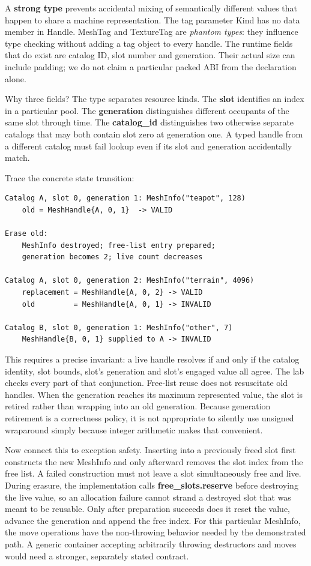 A \textbf{strong type} prevents accidental mixing of semantically different values that happen to share a machine representation. The tag parameter Kind has no data member in Handle. MeshTag and TextureTag are \emph{phantom types}: they influence type checking without adding a tag object to every handle. The runtime fields that do exist are catalog ID, slot number and generation. Their actual size can include padding; we do not claim a particular packed ABI from the declaration alone.

Why three fields? The type separates resource kinds. The \textbf{slot} identifies an index in a particular pool. The \textbf{generation} distinguishes different occupants of the same slot through time. The \textbf{catalog\_id} distinguishes two otherwise separate catalogs that may both contain slot zero at generation one. A typed handle from a different catalog must fail lookup even if its slot and generation accidentally match.

Trace the concrete state transition:

\begin{verbatim}
Catalog A, slot 0, generation 1: MeshInfo("teapot", 128)
    old = MeshHandle{A, 0, 1}  -> VALID

Erase old:
    MeshInfo destroyed; free-list entry prepared;
    generation becomes 2; live count decreases

Catalog A, slot 0, generation 2: MeshInfo("terrain", 4096)
    replacement = MeshHandle{A, 0, 2} -> VALID
    old         = MeshHandle{A, 0, 1} -> INVALID

Catalog B, slot 0, generation 1: MeshInfo("other", 7)
    MeshHandle{B, 0, 1} supplied to A -> INVALID
\end{verbatim}

This requires a precise invariant: a live handle resolves if and only if the catalog identity, slot bounds, slot's generation and slot's engaged value all agree. The lab checks every part of that conjunction. Free-list reuse does not resuscitate old handles. When the generation reaches its maximum represented value, the slot is retired rather than wrapping into an old generation. Because generation retirement is a correctness policy, it is not appropriate to silently use unsigned wraparound simply because integer arithmetic makes that convenient.

Now connect this to exception safety. Inserting into a previously freed slot first constructs the new MeshInfo and only afterward removes the slot index from the free list. A failed construction must not leave a slot simultaneously free and live. During erasure, the implementation calls \textbf{free\_slots.reserve} before destroying the live value, so an allocation failure cannot strand a destroyed slot that was meant to be reusable. Only after preparation succeeds does it reset the value, advance the generation and append the free index. For this particular MeshInfo, the move operations have the non-throwing behavior needed by the demonstrated path. A generic container accepting arbitrarily throwing destructors and moves would need a stronger, separately stated contract.

